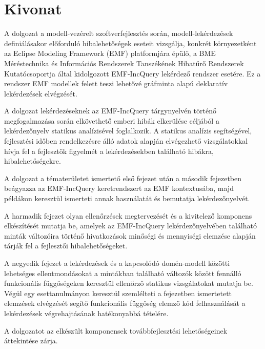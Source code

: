 \chapter*{Kivonat}

A dolgozat a modell-vezérelt szoftverfejlesztés során, modell-lekérdezések definiálásakor előforduló hibalehetőségek eseteit vizsgálja, konkrét környezetként az Eclipse Modeling Framework (EMF) platformjára épülő, a BME Méréstechnika és Információs Rendszerek Tanszékének Hibatűrő Rendszerek Kutatócsoportja által kidolgozott EMF-IncQuery lekérdező rendszer esetére.
Ez a rendszer EMF modellek felett teszi lehetővé gráfminta alapú deklaratív lekérdezések elvégzését.

A dolgozat lekérdezéseknek az EMF-IncQuery tárgynyelvén történő megfogalmazása során elkövethető emberi hibák elkerülése céljából a lekérdezőnyelv statikus analízisével foglalkozik.
A statikus analízis segítségével, fejlesztési időben rendelkezésre álló adatok alapján elvégezhető vizsgálatokkal hívja fel a fejlesztők figyelmét a lekérdezésekben található hibákra, hibalehetőségekre.

A dolgozat a tématerületet ismertető első fejezet után a második fejezetben beágyazza az EMF-IncQuery keretrendszert az EMF kontextusába, majd példákon keresztül ismerteti annak használatát és bemutatja lekérdezőnyelvét.

A harmadik fejezet olyan ellenőrzések megtervezését és a kivitelező komponens elkészítését mutatja be, amelyek az EMF-IncQuery lekérdezőnyelvében található minták változóira történő hivatkozások minőségi és mennyiségi elemzése alapján tárják fel a fejlesztői hibalehetőségeket.

A negyedik fejezet a lekérdezések és a kapcsolódó domén-modell közötti lehetséges ellentmondásokat a mintákban található változók között fennálló funkcionális függőségeken keresztül ellenőrző statikus vizsgálatokat mutatja be.
Végül egy esettanulmányon keresztül szemlélteti a fejezetben ismertetett elemzések elvégzését segítő funkcionális függőség elemző kód felhasználását a lekérdezések végrehajtásának hatékonyabbá tételére.

A dolgozatot az elkészült komponensek továbbfejlesztési lehetőségeinek áttekintése zárja.

\vfill

